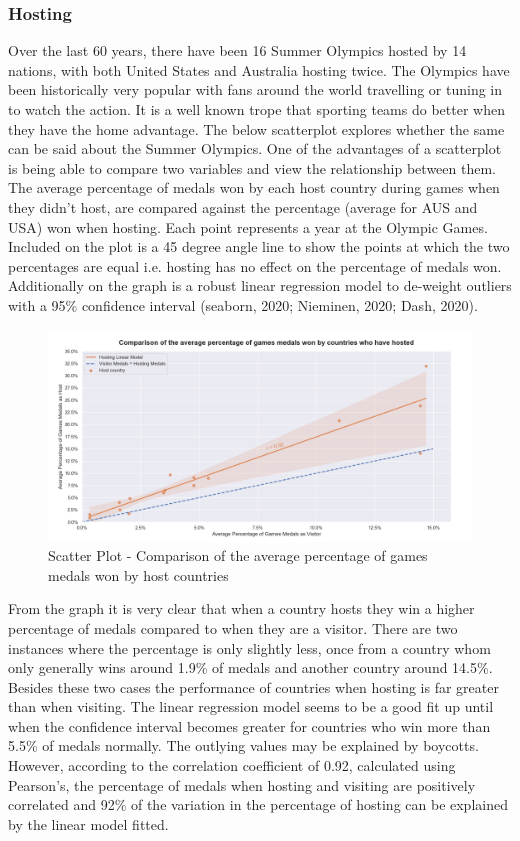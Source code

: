 \documentclass[a4 paper, 12pt]{article}
\begin{document}
        \subsubsection{Hosting}
        Over the last 60 years, there have been 16 Summer Olympics hosted by 14 nations, with both United States and Australia hosting twice. The Olympics have been historically very popular with fans around the world travelling or tuning in to watch the action. It is a well known trope that sporting teams do better when they have the home advantage. The below scatterplot explores whether the same can be said about the Summer Olympics. One of the advantages of a scatterplot is being able to compare two variables and view the relationship between them. The average percentage of medals won by each host country during games when they didn't host, are compared against the percentage (average for AUS and USA) won when hosting. Each point represents a year at the Olympic Games. Included on the plot is a 45 degree angle line to show the points at which the two percentages are equal i.e. hosting has no effect on the percentage of medals won. Additionally on the graph is a robust linear regression model to de-weight outliers with a 95\% confidence interval (seaborn, 2020; Nieminen, 2020; Dash, 2020). 

        \begin{figure} [H]
            \centering
            \includegraphics[width=\textwidth, frame]
                {./images/graph/countries_host_lmplot.png}      
                \caption{Scatter Plot - Comparison of the average percentage of games medals won by host countries} 
        \end{figure}
        From the graph it is very clear that when a country hosts they win a higher percentage of medals compared to when they are a visitor. There are two instances where the percentage is only slightly less, once from a country whom only generally wins around 1.9\% of medals and another country around 14.5\%. Besides these two cases the performance of countries when hosting is far greater than when visiting. The linear regression model seems to be a good fit up until when the confidence interval becomes greater for countries who win more than 5.5\% of medals normally. The outlying values may be explained by boycotts. However, according to the correlation coefficient of 0.92, calculated using Pearson's, the percentage of medals when hosting and visiting are positively correlated and 92\% of the variation in the percentage of hosting can be explained by the linear model fitted.
\end{document}
